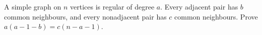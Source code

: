 A simple graph on $ n $ vertices is regular of degree $ a $. Every adjacent pair has $ b $ common neighbours, and every nonadjacent pair has $ c $ common neighbours. Prove $ a(a-1-b)=c(n-a-1)$.
